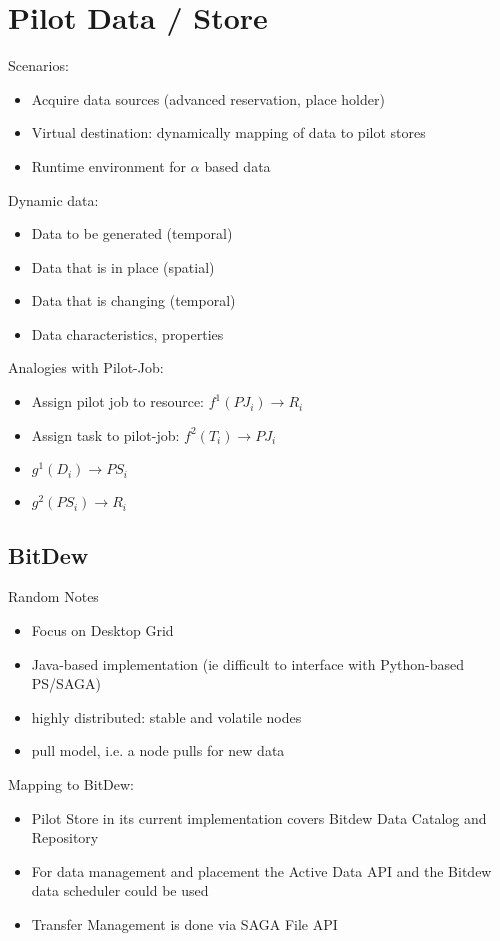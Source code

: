 \documentclass[]{article}
\begin{document}
\section{Pilot Data / Store}
\noindent
Scenarios:
\begin{itemize}
	\item Acquire data sources (advanced reservation, place holder)
	\item Virtual destination: dynamically mapping of data to pilot stores
	\item Runtime environment for $\alpha$ based data
\end{itemize}
	
\noindent	
Dynamic data:
\begin{itemize}
	\item Data to be generated (temporal)
	\item Data that is in place (spatial)
	\item Data that is changing (temporal)
	\item Data characteristics, properties
\end{itemize}	

\noindent
Analogies with Pilot-Job:
\begin{itemize}
	\item Assign pilot job to resource: $f^{1}(PJ_i) \rightarrow R_i$
	\item Assign task to pilot-job: $f^{2}(T_i) \rightarrow PJ_i$ 

	\item $g^{1} (D_i) \rightarrow PS_i$
	\item $g^{2} (PS_i) \rightarrow R_i$
\end{itemize}

\subsection{BitDew}

Random Notes
\begin{itemize}
	\item Focus on Desktop Grid
	\item Java-based implementation (ie difficult to interface with Python-based PS/SAGA)
	\item highly distributed: stable and volatile nodes
	\item pull model, i.e. a node pulls for new data
\end{itemize}


Mapping to BitDew:
\begin{itemize}
	\item Pilot Store in its current implementation covers Bitdew Data Catalog and Repository
	\item For data management and placement the Active Data API and the Bitdew data scheduler could be used
	\item Transfer Management is done via SAGA File API	
\end{itemize}
\end{document}

